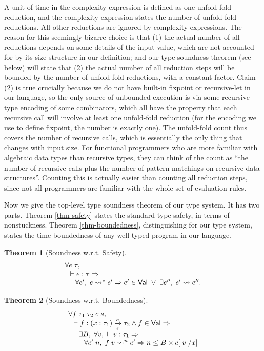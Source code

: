 \documentclass[preprint]{sigplanconf}
\newcommand{\arrow}[4]{#1\xrightarrow[#3]{#2}#4}
\newtheorem{thm}{Theorem}
\begin{document}
A unit of time in the complexity expression is defined as one unfold-fold reduction, and the complexity expression states the number of unfold-fold reductions. All other reductions are ignored by complexity expressions. The reason for this seemingly bizarre choice is that (1) the actual number of all reductions depends on some details of the input value, which are not accounted for by its size structure in our definition; and our type soundness theorem (see below) will state that (2) the actual number of all reduction steps will be bounded by the number of unfold-fold reductions, with a constant factor. Claim (2) is true crucially because we do not have built-in fixpoint or recursive-let in our language, so the only source of unbounded execution is via some recursive-type encoding of some combinators, which all have the property that each recursive call will involve at least one unfold-fold reduction (for the encoding we use to define fixpoint, the number is exactly one). The unfold-fold count thus covers the number of recursive calls, which is essentially the only thing that changes with input size. For functional programmers who are more familiar with algebraic data types than recursive types, they can think of the count as ``the number of recursive calls plus the number of pattern-matchings on recursive data structures''. Counting this is actually easier than counting all reduction steps, since not all programmers are familiar with the whole set of evaluation rules. 

Now we give the top-level type soundness theorem of our type system. It has two parts. Theorem \ref{thm-safety} states the standard type safety, in terms of nonstuckness. Theorem \ref{thm-boundedness}, distinguishing for our type system, states the time-boundedness of any well-typed program in our language.

\begin{thm}[\label{thm-safety}Soundness w.r.t. Safety]
$$
\begin{array}{l}
\forall e\;\tau, \\
\hspace{.1in} \vdash e:\tau \Rightarrow \\
\hspace{.2in} \forall e',\; e \leadsto^* e' \Rightarrow e'\in\mathsf{Val} \;\vee\; \exists e'',\;e' \leadsto e''.
\end{array}
$$
\end{thm}

\begin{thm}[\label{thm-boundedness}Soundness w.r.t. Boundedness]
$$
\begin{array}{l}
\forall f\;\tau_1\;\tau_2\;c\;s, \\
\hspace{0.1in} \vdash f:\arrow{(x:\tau_1)}{c}{s}{\tau_2} \wedge f\in\mathsf{Val}\Rightarrow \\
\hspace{0.2in} \exists B, \;\forall v,\; \vdash v:\tau_1 \Rightarrow \\
\hspace{0.3in} \forall e'\;n,\; f\;v\leadsto^n e' \Rightarrow n\leq B\times c[|v|/x]
\end{array}
$$
\end{thm}
\end{document}
